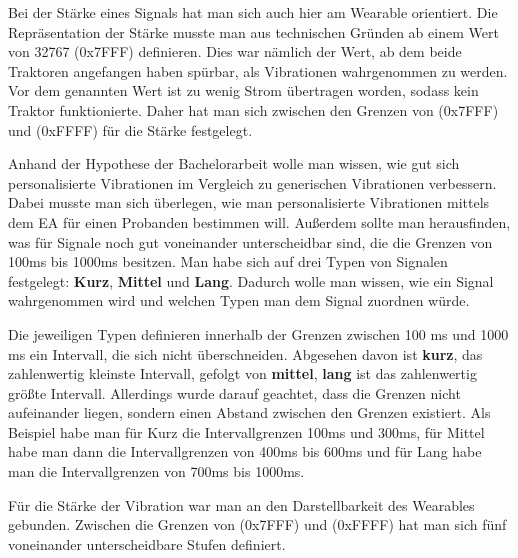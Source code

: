 Bei der St{\"a}rke eines Signals hat man sich auch hier am Wearable orientiert. 
Die Repr{\"a}sentation der St{\"a}rke musste man aus technischen Gr{\"u}nden ab einem Wert von 32767 (0x7FFF) definieren. Dies war n{\"a}mlich der Wert, ab dem beide Traktoren angefangen haben sp{\"u}rbar, als Vibrationen wahrgenommen zu werden.
Vor dem genannten Wert ist zu wenig Strom {\"u}bertragen worden, sodass kein Traktor funktionierte.
Daher hat man sich zwischen den Grenzen von (0x7FFF) und (0xFFFF) f{\"u}r die St{\"a}rke festgelegt. 

Anhand der Hypothese der Bachelorarbeit wolle man wissen, wie gut sich personalisierte Vibrationen im Vergleich zu generischen Vibrationen verbessern. Dabei musste man sich {\"u}berlegen, wie man personalisierte Vibrationen mittels dem EA f{\"u}r einen Probanden bestimmen will.
Au{\ss}erdem sollte man herausfinden, was f{\"u}r Signale noch gut voneinander unterscheidbar sind, die die Grenzen von 100ms bis 1000ms besitzen.
Man habe sich auf drei Typen von Signalen festgelegt: \textbf{Kurz}, \textbf{Mittel} und \textbf{Lang}. Dadurch wolle man wissen, wie ein Signal wahrgenommen wird und welchen Typen man dem Signal zuordnen w{\"u}rde.

Die jeweiligen Typen definieren innerhalb der Grenzen zwischen 100 ms und 1000 ms ein Intervall, die sich nicht {\"u}berschneiden. Abgesehen davon ist \textbf{kurz}, das zahlenwertig kleinste Intervall, gefolgt von \textbf{mittel}, \textbf{lang} ist das zahlenwertig gr{\"o}{\ss}te Intervall.
Allerdings wurde darauf geachtet, dass die Grenzen nicht aufeinander liegen, sondern einen Abstand zwischen den Grenzen existiert.
Als Beispiel habe man f{\"u}r Kurz die Intervallgrenzen 100ms und 300ms, f{\"u}r Mittel habe man dann die Intervallgrenzen von 400ms bis 600ms und f{\"u}r Lang habe man die Intervallgrenzen von 700ms bis 1000ms. 

F{\"u}r die St{\"a}rke der Vibration war man an den Darstellbarkeit des Wearables gebunden. Zwischen die Grenzen von (0x7FFF) und (0xFFFF) hat man sich f{\"u}nf voneinander unterscheidbare Stufen definiert.



